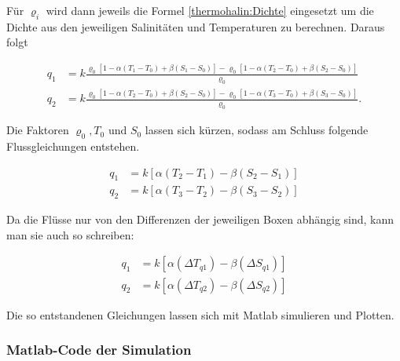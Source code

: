 Für $\varrho_i$ wird dann jeweils die Formel \ref{thermohalin:Dichte} eingesetzt um die Dichte aus den jeweiligen Salinitäten und Temperaturen zu berechnen. Daraus folgt

\begin{equation}
\begin{aligned}
q_1 &= k\frac{\varrho_0[1-\alpha(T_1-T_0)+\beta(S_1-S_0)]-\varrho_0[1-\alpha(T_2-T_0)+\beta(S_2-S_0)]}{\varrho_0}
\\
q_2 &= k\frac{\varrho_0[1-\alpha(T_2-T_0)+\beta(S_2-S_0)]-\varrho_0[1-\alpha(T_3-T_0)+\beta(S_3-S_0)]}{\varrho_0}.
\end{aligned}
\end{equation}

Die Faktoren $\varrho_0, T_0$ und $S_0$ lassen sich kürzen, sodass am Schluss folgende Flussgleichungen entstehen.

\begin{equation}
\begin{aligned}
 q_1 &= k[\alpha(T_2-T_1)-\beta(S_2-S_1)] 
 \\
 q_2 &= k[\alpha(T_3-T_2)-\beta(S_3-S_2)]
\end{aligned}
\end{equation}

Da die Flüsse nur von den Differenzen der jeweiligen Boxen abhängig sind, kann man sie auch so schreiben:

\begin{equation}
\begin{aligned}
q_1 &= k[\alpha(\Delta T_{q1})-\beta(\Delta S_{q1})] 
\\
q_2 &= k[\alpha(\Delta T_{q2})-\beta(\Delta S_{q2})]
\end{aligned}
\end{equation}

Die so entstandenen Gleichungen lassen sich mit Matlab simulieren und Plotten.
\subsubsection{Matlab-Code der Simulation}

